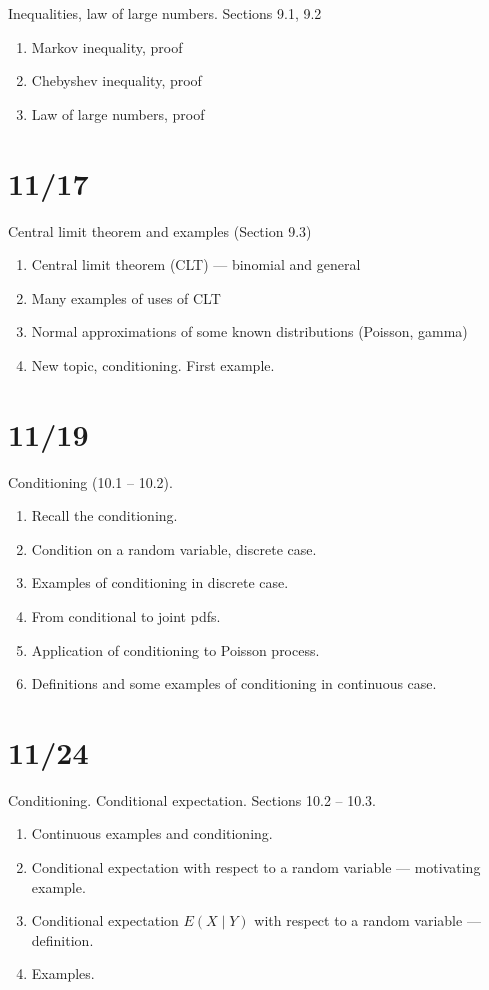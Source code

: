\documentclass[letterpaper,11pt,oneside,reqno]{amsart}
\numberwithin{equation}{section}
\theoremstyle{definition}
\begin{document}
Inequalities, law of large numbers. Sections 9.1, 9.2
\begin{enumerate}
	\item Markov inequality, proof
	\item Chebyshev inequality, proof
	\item Law of large numbers, proof
\end{enumerate}

\section{11/17}

Central limit theorem and examples (Section 9.3)
\begin{enumerate}
	\item Central limit theorem (CLT) --- binomial and general
	\item Many examples of uses of CLT
	\item Normal approximations of some known distributions (Poisson, gamma)
	\item New topic, conditioning. First example.
\end{enumerate}

\section{11/19}

Conditioning (10.1 -- 10.2).
\begin{enumerate}
	\item Recall the conditioning.
	\item Condition on a random variable, discrete case.
	\item Examples of conditioning in discrete case.
	\item From conditional to joint pdfs.
	\item Application of conditioning to Poisson process.
	\item Definitions and some examples of conditioning in continuous case.
\end{enumerate}

\section{11/24}

Conditioning. Conditional expectation. Sections 10.2 -- 10.3.
\begin{enumerate}
	\item Continuous examples and conditioning.
	\item Conditional expectation with respect to a random variable --- motivating example.
	\item Conditional expectation $E(X\mid Y)$
		with respect to a random variable --- definition.
	\item Examples.
\end{enumerate}
\end{document}
